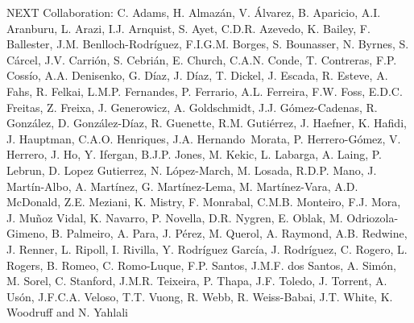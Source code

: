 NEXT Collaboration: C. Adams, H. Almaz\'an, V. \'Alvarez, B. Aparicio, A.I. Aranburu, L. Arazi, I.J. Arnquist, S. Ayet, C.D.R. Azevedo, K. Bailey, F. Ballester, J.M. Benlloch-Rodr\'{i}guez, F.I.G.M. Borges, S. Bounasser, N. Byrnes, S. C\'arcel, J.V. Carri\'on, S. Cebri\'an, E. Church, C.A.N. Conde, T. Contreras, F.P. Coss\'io, A.A. Denisenko, G. D\'iaz, J. D\'iaz, T. Dickel, J. Escada, R. Esteve, A. Fahs, R. Felkai, L.M.P. Fernandes, P. Ferrario, A.L. Ferreira, F.W. Foss, E.D.C. Freitas, Z. Freixa, J. Generowicz, A. Goldschmidt, J.J. G\'omez-Cadenas, R. Gonz\'alez, D. Gonz\'alez-D\'iaz, R. Guenette, R.M. Guti\'errez, J. Haefner, K. Hafidi, J. Hauptman, C.A.O. Henriques, J.A. Hernando~Morata, P. Herrero-G\'omez, V. Herrero, J. Ho, Y. Ifergan, B.J.P. Jones, M. Kekic, L. Labarga, A. Laing, P. Lebrun, D. Lopez Gutierrez, N. L\'opez-March, M. Losada, R.D.P. Mano, J. Mart\'in-Albo, A. Mart\'inez, G. Mart\'inez-Lema, M. Mart\'inez-Vara, A.D. McDonald, Z.E. Meziani, K. Mistry, F. Monrabal, C.M.B. Monteiro, F.J. Mora, J. Mu\~noz Vidal, K. Navarro, P. Novella, D.R. Nygren, E. Oblak, M. Odriozola-Gimeno, B. Palmeiro, A. Para, J. P\'erez, M. Querol, A. Raymond, A.B. Redwine, J. Renner, L. Ripoll, I. Rivilla, Y. Rodr\'iguez Garc\'ia, J. Rodr\'iguez, C. Rogero, L. Rogers, B. Romeo, C. Romo-Luque, F.P. Santos, J.M.F. dos Santos, A. Sim\'on, M. Sorel, C. Stanford, J.M.R. Teixeira, P. Thapa, J.F. Toledo, J. Torrent, A. Us\'on, J.F.C.A. Veloso, T.T. Vuong, R. Webb, R. Weiss-Babai, J.T. White, K. Woodruff and N. Yahlali